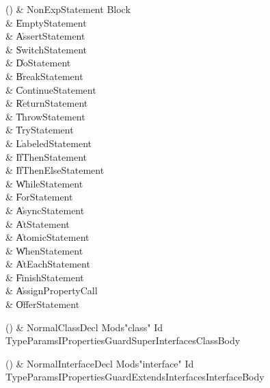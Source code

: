 \begin{bbgrammarappendix}

() & NonExpStatement \label{prod:NonExpStatement}  \: Block  \\

 &    \| EmptyStatement \\
 &    \| AssertStatement \\
 &    \| SwitchStatement \\
 &    \| DoStatement \\
 &    \| BreakStatement \\
 &    \| ContinueStatement \\
 &    \| ReturnStatement \\
 &    \| ThrowStatement \\
 &    \| TryStatement \\
 &    \| LabeledStatement \\
 &    \| IfThenStatement \\
 &    \| IfThenElseStatement \\
 &    \| WhileStatement \\
 &    \| ForStatement \\
 &    \| AsyncStatement \\
 &    \| AtStatement \\
 &    \| AtomicStatement \\
 &    \| WhenStatement \\
 &    \| AtEachStatement \\
 &    \| FinishStatement \\
 &    \| AssignPropertyCall \\
 &    \| OfferStatement \\

\end{bbgrammarappendix}

\begin{bbgrammarappendix}

() & NormalClassDecl \label{prod:NormalClassDecl}  \: Mods\opt \xcd"class" Id TypeParamsI\opt Properties\opt Guard\opt Super\opt Interfaces\opt ClassBody  \\


\end{bbgrammarappendix}

\begin{bbgrammarappendix}

() & NormalInterfaceDecl \label{prod:NormalInterfaceDecl}  \: Mods\opt \xcd"interface" Id TypeParamsI\opt Properties\opt Guard\opt ExtendsInterfaces\opt InterfaceBody  \\


\end{bbgrammarappendix}

